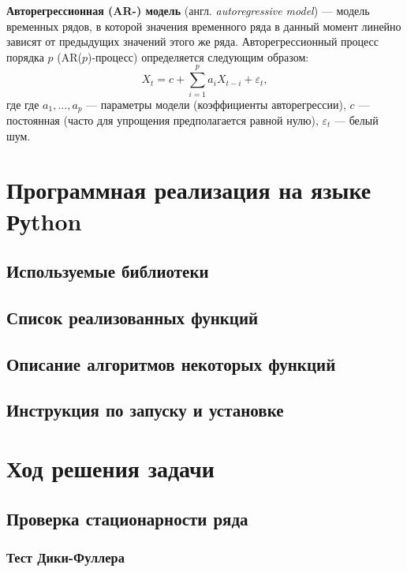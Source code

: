 \documentclass{article}
\begin{document}
  \textbf{Авторегрессионная (AR-) модель} (англ. \textsl{autoregressive model}) — модель временных рядов, в которой значения временного ряда в данный момент линейно зависят от предыдущих значений этого же ряда. Авторегрессионный процесс порядка $p$ (AR($p$)-процесс) определяется следующим образом:
  \begin{equation}
      X_t = c + \sum\limits_{i=1}^{p} a_i X_{t-i} + \varepsilon_t ,
  \end{equation}
  где где $a_1,\ldots ,a_p$ — параметры модели (коэффициенты авторегрессии), $c$ — постоянная (часто для упрощения предполагается равной нулю), $\varepsilon_t$ — белый шум.\par

\newpage

\section{Программная реализация на языке Руthon}
  
  \subsection{Используемые библиотеки}
  
  \subsection{Список реализованных функций}
  
  \subsection{Описание алгоритмов некоторых функций}
  
  \subsection{Инструкция по запуску и установке}
  
\newpage  
  
\section{Ход решения задачи}

  \subsection{Проверка стационарности ряда}
    
    \subsubsection{Тест Дики-Фуллера}
    
\end{document}
